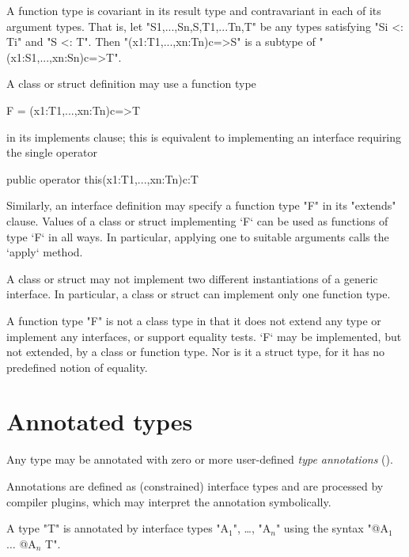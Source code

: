 A function type is covariant in its result type and contravariant in
each of its argument types. That is, let 
\xcd"S1,...,Sn,S,T1,...Tn,T" be any
types satisfying \xcd"Si <: Ti" and \xcd"S <: T". Then
\xcd"(x1:T1,...,xn:Tn){c}=>S" is a subtype of
\xcd"(x1:S1,...,xn:Sn){c}=>T".

A class or struct definition may use a function type 
\begin{xtenmath}
F = (x1:T1,...,xn:Tn){c}=>T
\end{xtenmath}
in its 
implements clause; 
this is equivalent to implementing an interface requiring the single operator
\begin{xtenmath}
public operator this(x1:T1,...,xn:Tn){c}:T
\end{xtenmath}
Similarly, an interface
definition may specify a function type \xcd"F" in its \xcd"extends" clause.
Values of a class or struct implementing \xcd`F` 
can be used as functions of type \xcd`F` in all ways.  
In particular, applying one to suitable arguments calls the \xcd`apply`
method. 

\limitationx{} A class or struct may not implement two different
instantiations of a generic interface. In particular, a class or
struct can implement only one function type.


A function type \xcd"F" is not a class type in that it does not extend any
type or implement any interfaces, or support equality tests. 
\xcd`F` may be implemented, but not extended, by a class or function type. 
Nor is it a struct type, for it has no predefined notion of equality.


\section{Annotated types}
\label{AnnotatedTypes}


        Any \Xten{} type may be annotated with zero or more
        user-defined \emph{type annotations}
        ().  

        Annotations are defined as (constrained) interface types and are
        processed by compiler plugins, which may interpret the
        annotation symbolically.

        A type \xcd"T" is annotated by interface types
        \xcdmath"A$_1$", \dots,
        \xcdmath"A$_n$"
        using the syntax
        \xcdmath"@A$_1$ $\dots$ @A$_n$ T".

